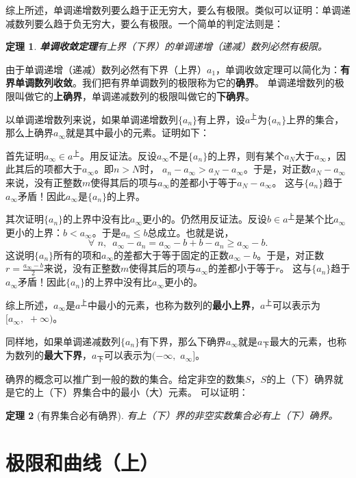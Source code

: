 \documentclass[12pt,UTF8]{ctexbook}
\newtheorem{tm}{定理}[section]
\begin{document}
综上所述，单调递增数列要么趋于正无穷大，要么有极限。类似可以证明：单调递减数列要么趋于负无穷大，要么有极限。一个简单的判定法则是：
\begin{tm}\textbf{单调收敛定理}\label{tm:2-2-0}
    有上界（下界）的单调递增（递减）数列必然有极限。
\end{tm}
由于单调递增（递减）数列必然有下界（上界）$a_1$，单调收敛定理可以简化为：\textbf{有界单调数列收敛}。我们把有界单调数列的极限称为它的\textbf{确界}。
单调递增数列的极限叫做它的\textbf{上确界}，单调递减数列的极限叫做它的\textbf{下确界}。

以单调递增数列来说，如果单调递增数列$\{a_n\}$有上界，设$a^{\text{上}}$为$\{a_n\}$上界的集合，那么上确界$a_\infty$就是其中最小的元素。证明如下：

首先证明$a_\infty \in a^{\text{上}}$。用反证法。反设$a_\infty$不是$\{a_n\}$的上界，则有某个$a_N$大于$a_\infty$，因此其后的项都大于$a_\infty$。即$n > N$时，
$a_n - a_\infty > a_N - a_\infty$。于是，对正数$a_N - a_\infty$来说，没有正整数$m$使得其后的项与$a_\infty$的差都小于等于$a_N - a_\infty$。
这与$\{a_n\}$趋于$a_\infty$矛盾！因此$a_\infty$是$\{a_n\}$的上界。

其次证明$\{a_n\}$的上界中没有比$a_\infty$更小的。仍然用反证法。反设$b \in a^{\text{上}}$是某个比$a_\infty$更小的上界：$b < a_\infty$。于是$a_n \leqslant b$总成立。也就是说，
$$\forall \,\, n, \,\,\, a_\infty - a_n = a_\infty - b + b - a_n \geqslant a_\infty - b.$$
这说明$\{a_n\}$所有的项和$a_\infty$的差都大于等于固定的正数$a_\infty - b$。于是，对正数$r = \frac{a_\infty - b}{2}$来说，没有正整数$m$使得其后的项与$a_\infty$的差都小于等于$r$。
这与$\{a_n\}$趋于$a_\infty$矛盾！因此$\{a_n\}$的上界中没有比$a_\infty$更小的。

综上所述，$a_\infty$是$a^{\text{上}}$中最小的元素，也称为数列的\textbf{最小上界}，$a^{\text{上}}$可以表示为$[a_\infty, \,\,+\infty)$。

同样地，如果单调递减数列$\{a_n\}$有下界，那么下确界$a_\infty$就是$a_{\text{下}}$最大的元素，也称为数列的\textbf{最大下界}，$a_{\text{下}}$可以表示为$(-\infty,\,\,a_\infty]$。 

确界的概念可以推广到一般的数的集合。给定非空的数集$S$，$S$的上（下）确界就是它的上（下）界集合中的最小（大）元素。
可以证明：
\begin{tm}[有界集合必有确界]\label{tm:2-2-10}
    有上（下）界的非空实数集合必有上（下）确界。
\end{tm}

\section{极限和曲线（上）}
\end{document}
